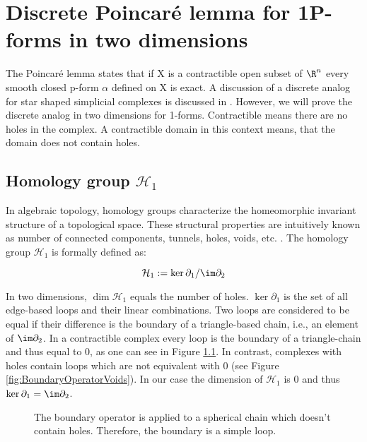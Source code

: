 \begin{appendix}
\label{ch:appendix}

\chapter{Discrete Poincaré lemma for 1P-forms in two dimensions}
\label{ap:PoinCLemma}
The Poincaré lemma states that if X is a contractible open subset of $\R^n$ every smooth closed p-form $\alpha$ defined on X is exact.
A discussion of a discrete analog for star shaped simplicial complexes is discussed in \cite{DES01}.
However, we will prove the discrete analog in two dimensions for 1-forms.
Contractible means there are no holes in the complex.
A contractible domain in this context means, that the domain does not contain holes.

\section{Homology group $\mathcal{H}_1$}
\label{sec:HomologyGroup}
In algebraic topology, homology groups characterize the homeomorphic invariant structure of a topological space.
These structural properties are intuitively known as number of connected components, tunnels, holes, voids, etc. .
The homology group $\mathcal{H}_1$ is formally defined as:

\begin{equation} 
\mathcal{H}_1 := \ker \partial_1 / \im \partial_2
\end{equation}

In two dimensions, $\dim \mathcal{H}_1$ equals the number of holes. 
$\ker \partial_1$ is the set of all edge-based loops and their linear combinations. Two loops are considered to be equal if their difference is the boundary of a triangle-based chain, i.e., an element of $\im \partial_2$.
In a contractible complex every loop is the boundary of a triangle-chain and thus equal to $0$, as one can see in Figure \ref{fig:BoundaryOperatorNoVoids}. 
In contrast, complexes with holes contain loops which are not equivalent with $0$ (see Figure \ref{fig:BoundaryOperatorVoids}).  
In our case the dimension of $\mathcal{H}_1$ is $0$ and thus $\ker \partial_1 = \im \partial_2$.

\begin{figure}[htbp]
	\centering
 	
	\caption{The boundary operator is applied to a spherical chain which doesn't contain holes. Therefore, the boundary is a simple loop.}
	\label{fig:BoundaryOperatorNoVoids}
\end{figure}	


\end{appendix}

